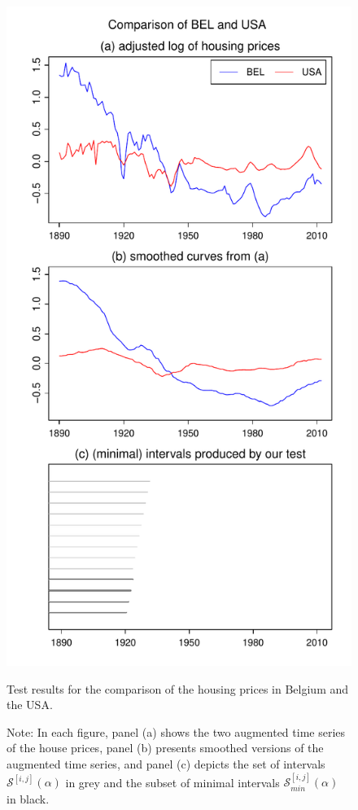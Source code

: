 \documentclass[a4paper,12pt]{article}
\begin{document}
\begin{figure}[t!]
\hspace{0.25cm}
\begin{minipage}[t]{0.49\textwidth}
\includegraphics[width=\textwidth]{output/plots/hp/hp_BEL_vs_USA}
\caption{Test results for the comparison of the housing prices in Belgium and the USA.}\label{fig:hp:Belgium:USA}
\end{minipage}
\caption*{Note: In each figure, panel (a) shows the two augmented time series of the house prices, panel (b) presents smoothed versions of the augmented time series, and panel (c) depicts the set of intervals $\mathcal{S}^{[i, j]}(\alpha)$ in grey and the subset of minimal intervals $\mathcal{S}^{[i, j]}_{min}(\alpha)$ in black.}
\end{figure}
\end{document}
